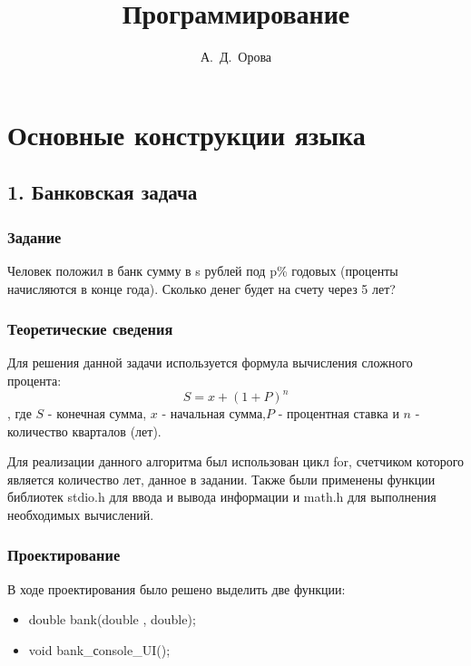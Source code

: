 \documentclass[12pt,a4paper]{report}
\author{А.~Д.~Орова}
\title{Программирование}
\begin{document}
\listoftodos
\maketitle
\tableofcontents{}

\chapter{Основные конструкции языка}
\section{1. Банковская задача}
\subsection{Задание}
\hspace{\parindent}
Человек положил в банк сумму в s рублей под p\% годовых (проценты начисляются в конце года). Сколько денег будет на счету через 5 лет? 

\subsection{Теоретические сведения}
\hspace{\parindent}
Для решения данной задачи используется формула вычисления сложного процента: \begin{displaymath} S = x + (1 + P)^{n}  \end{displaymath}, где $S$ - конечная сумма, $x$ - начальная сумма,$P$ - процентная ставка и $n$ - количество кварталов (лет).

Для реализации данного алгоритма был использован цикл for, счетчиком которого является
количество лет, данное в задании. Также были применены функции библиотек stdio.h для ввода и вывода информации и math.h для выполнения необходимых вычислений.

\subsection{Проектирование}
\hspace{\parindent}
В ходе проектирования было решено выделить две функции:
\begin{itemize}
\item double bank(double , double);
\item void bank\_сonsole\_UI();
\end{itemize}
\end{document}
